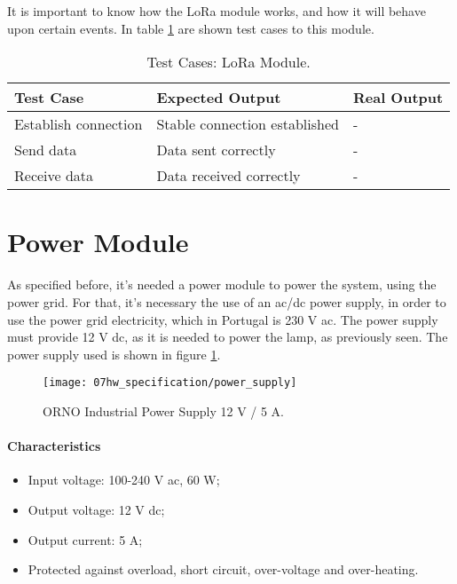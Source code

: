 
It is important to know how the LoRa module works, and how it will behave upon certain events. In table \ref{table:test_lora} are shown test cases to this module.

\begin{table}[H]
	\centering
	\resizebox{\columnwidth}{!}
	{
		\begin{tabular}{|m{3cm}|m{5cm}||m{5cm}|}
			\hline
			\textbf{Test Case} & \textbf{Expected Output} & \textbf{Real Output}
			\\\hline\hline
			Establish connection & Stable connection established & -
			\\\hline
			Send data & Data sent correctly & -
			\\\hline
			Receive data & Data received correctly & -
			\\\hline
		\end{tabular}
	}
	\caption{Test Cases: LoRa Module.}
	\label{table:test_lora}
\end{table}

\section{Power Module}
As specified before, it's needed a power module to power the system, using the power grid. For that, it's necessary the use of an \ac{ac}/\ac{dc} power supply, in order to use the power grid electricity, which in Portugal is 230 V \ac{ac}. The power supply must provide 12 V \ac{dc}, as it is needed to power the lamp, as previously seen. The power supply used is shown in figure \ref{fig:power_supply}. \cite{power_supply}

\begin{figure}[H]
	\centering
	\texttt{[image: 07hw\_specification/power\_supply]}
	\caption{ORNO Industrial Power Supply 12 V / 5 A.}
	\label{fig:power_supply}
\end{figure}

\paragraph*{Characteristics}
\begin{itemize}
	\item Input voltage: 100-240 V \ac{ac}, 60 W;
	\item Output voltage: 12 V \ac{dc};
	\item Output current: 5 A;
	\item Protected against overload, short circuit, over-voltage and over-heating.
\end{itemize}

